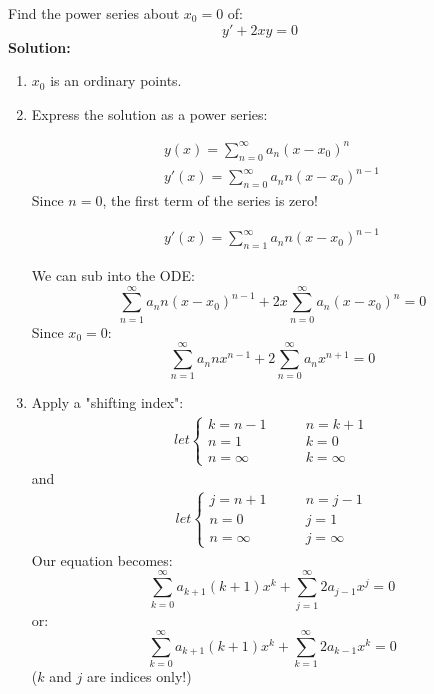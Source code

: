 \begin{exmp}{}
Find the power series about $x_0=0$ of:
\begin{equation*}
y'+2xy=0
\end{equation*}
\textbf{Solution:}\\
\begin{enumerate}
\item $x_0$ is an ordinary points.
\item Express the solution as a power series:

\begin{align*}
y(x) = \sum^\infty_{n=0} a_n\left(x-x_0\right)^n\\
y'(x) = \sum^\infty_{n=0} a_n n\left(x-x_0\right)^{n-1}
\end{align*}
Since $n=0$, the first term of the series is zero!

\begin{align*}
y'(x) = \sum^\infty_{n=1} a_n n\left(x-x_0\right)^{n-1}
\end{align*}

We can sub into the ODE:
\begin{equation*}
\sum^\infty_{n=1} a_n n\left(x-x_0\right)^{n-1}+2x\sum^\infty_{n=0} a_n\left(x-x_0\right)^n=0
\end{equation*}
Since $x_0=0$:
\begin{equation*}
\sum^\infty_{n=1} a_n nx^{n-1}+2\sum^\infty_{n=0} a_nx^{n+1}=0
\end{equation*}
\item Apply a "shifting index":
\begin{align*}
let \begin{cases}
k=n-1 \qquad &n=k+1\\
n=1 &k=0\\
n=\infty &k=\infty
\end{cases}
\end{align*}
 and 
 \begin{align*}
let \begin{cases}
j=n+1 \qquad &n=j-1\\
n=0 &j=1\\
n=\infty &j=\infty
\end{cases}
\end{align*}
Our equation becomes:
\begin{equation*}
\sum^\infty_{k=0} a_{k+1} (k+1) x^{k}+\sum^\infty_{j=1}2 a_{j-1}x^{j}=0
\end{equation*}
or:
\begin{equation*}
\sum^\infty_{k=0} a_{k+1} (k+1) x^{k}+\sum^\infty_{k=1}2 a_{k-1}x^{k}=0
\end{equation*}
($k$ and $j$ are indices only!)


\end{enumerate}
\end{exmp}
